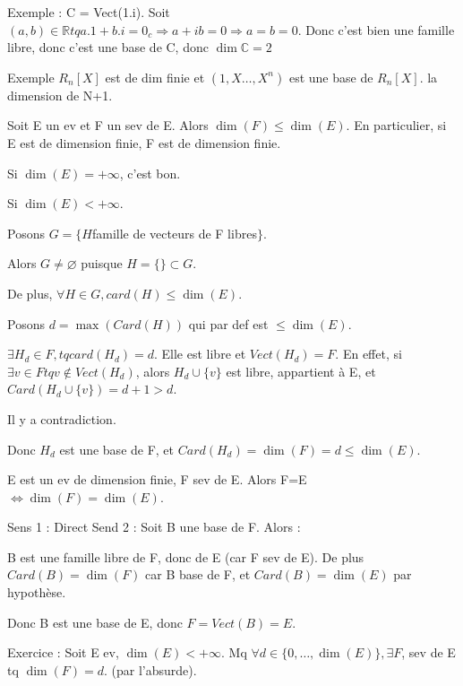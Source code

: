 \documentclass[french]{yLectureNote}
\newcommand{\R}[0]{\mathbb{R}}
\newcommand{\C}[0]{\mathbb{C}}
\begin{document}
Exemple : C = Vect(1.i). Soit $(a,b)\in \R tq a.1+b.i = 0_c \Rightarrow a+ib = 0 \Rightarrow a=b=0$. Donc c'est bien une famille libre, donc c'est une base de C, donc $\dim \C = 2$




Exemple $R_n[X]$ est de dim finie et $(1,X\dots,X^n)$ est une base de $R_n[X]$. la dimension de N+1.
\begin{proposition}
Soit E un ev et F un sev de E. Alors \(\dim(F)\leq \dim(E)\). En particulier, si E est de dimension finie, F est de dimension finie.
\end{proposition}
\begin{myproof}
 Si $\dim(E)=+\infty$, c'est bon.

 Si $\dim(E)<+\infty$.

 Posons $G = \{H $famille de vecteurs de F libres$\}$.

 Alors $G \neq \varnothing$ puisque $H = \{\} \subset G$.

 De plus, $\forall H \in G, card(H)\leq \dim(E)$.

 Posons $d=\max(Card(H))$ qui par def est $\leq \dim(E)$.

 $\exists H_d \in F, tq card(H_d) = d$. Elle est libre et $Vect(H_d) = F$. En effet, si $\exists v\in F tq v\notin Vect(H_d)$, alors $H_d \cup  \{v\}$ est libre, appartient à E, et $Card(H_d \cup \{v\}) = d+1 >d$.

 Il y a contradiction.

 Donc $H_d$ est une base de F, et $Card(H_d) = \dim(F) = d\leq \dim(E)$.
\end{myproof}
\begin{proposition}
E est un ev de dimension finie, F sev de E. Alors F=E \(\iff \dim(F) = \dim(E)\).
\end{proposition}
\begin{myproof}
 Sens 1 : Direct
 Send 2 : Soit B une base de F. Alors :

 B est une famille libre de F, donc de E (car F sev de E). De plus $Card(B)=\dim(F)$ car B base de F, et $Card(B)=\dim(E)$ par hypothèse.

 Donc B est une base de E, donc $F=Vect(B)=E$.
\end{myproof}
Exercice : Soit E ev, $\dim(E)<+\infty$. Mq $\forall d\in \{0,\dots, \dim(E)\},\exists F$, sev de E tq $\dim(F)=d$. (par l'absurde).
\end{document}
